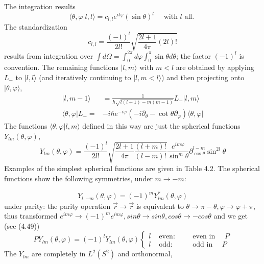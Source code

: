 The integration results
\begin{equation}
    \langle\theta, \varphi | l, l\rangle= c_{l, l} e^{i l \varphi}(\sin \theta)^{l} \quad \text { with } l \text { all. }
    \end{equation}
The standardization
\begin{equation}
    c_{l, l}=\frac{(-1)^{l}}{2 l !} \sqrt{\frac{2 l+1}{4 \pi}(2 l) !}
    \end{equation}
results from integration over $\int d \Omega=\int_{0}^{2 \pi} d \varphi \int_{0}^{\pi} \sin \theta d \theta$; the factor $(-1)^{l}$ is convention. The remaining functions $|l,m\rangle$ with $m <l$ are obtained by applying $L_-$ to $| l, l\rangle$ (and iteratively continuing to $| l, m <l\rangle$) and then projecting onto $|\theta,\varphi\rangle$,
\begin{equation}
\begin{aligned}|l, m-1\rangle &=\frac{1}{\hbar \sqrt{l(l+1)-m(m-1)}} L_{-}|l, m\rangle \\\langle\theta, \varphi| L_{-}=&-i \hbar e^{-i \varphi}\left(-i \partial_{\theta}-\cot \theta \partial_{\varphi}\right)\langle\theta, \varphi| \end{aligned}
\end{equation}
The functions $\langle \theta,\varphi|l,m\rangle$ defined in this way are just the spherical functions $Y_{lm} (\theta, \varphi)$,
\begin{equation}
    Y_{l m}(\theta, \varphi)=\frac{(-1)^{l}}{2 l !} \sqrt{\frac{2 l+1}{4 \pi} \frac{(l+m) !}{(l-m) !}} \frac{e^{i m \varphi}}{\sin ^{m} \theta} \partial_{\cos \theta}^{l-m} \sin ^{2 l} \theta
    \end{equation}
Examples of the simplest spherical functions are given in Table 4.2.
The spherical functions show the following symmetries, under $m \to -m$:

\begin{equation}
    Y_{l,-m}(\theta, \varphi)=(-1)^{m} Y_{l m}^{*}(\theta, \varphi)
    \end{equation}
under parity: the parity operation $\vec{r} \to \vec{r}$ is equivalent to $\theta \to \pi - \theta, \varphi \to \varphi + \pi$, thus transformed $e^{im\varphi} \to (-1)^m e^{im\varphi}, sin \theta \to sin \theta, cos \theta \to - cos \theta$ and we get (see (4.49))
\begin{equation}
P Y_{l m}(\theta, \varphi)=(-1)^{l} Y_{l m}(\theta, \varphi)\left\{\begin{array}{ll}{l} & {\text { even: }} \\ {l} & {\text { odd: }}\end{array} \quad \begin{array}{c}{\text { even in } \quad P} \\ {\text { odd in } \quad P}\end{array}\right.
\end{equation}
The $Y_{lm}$ are completely in $L^2(S^2)$ and orthonormal,

